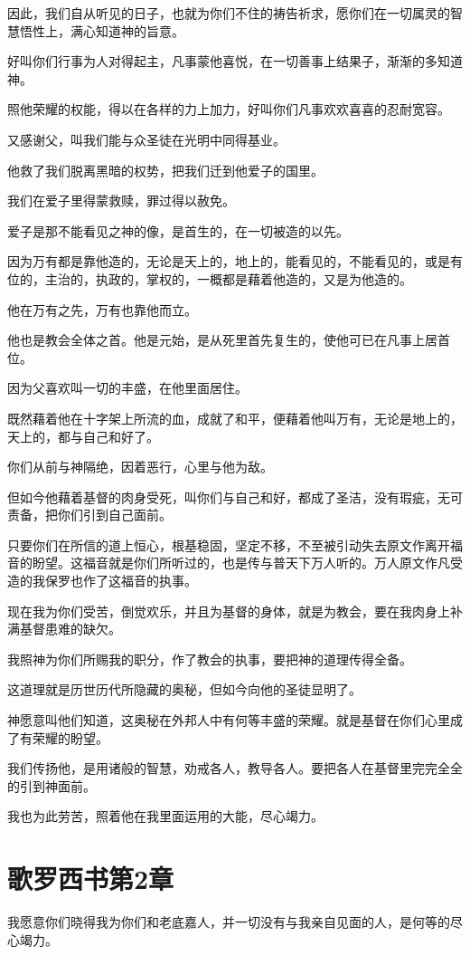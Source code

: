\documentclass[12pt,oneside]{book}
\begin{document}
因此，我们自从听见的日子，也就为你们不住的祷告祈求，愿你们在一切属灵的智慧悟性上，满心知道神的旨意。

好叫你们行事为人对得起主，凡事蒙他喜悦，在一切善事上结果子，渐渐的多知道神。

照他荣耀的权能，得以在各样的力上加力，好叫你们凡事欢欢喜喜的忍耐宽容。

又感谢父，叫我们能与众圣徒在光明中同得基业。

他救了我们脱离黑暗的权势，把我们迁到他爱子的国里。

我们在爱子里得蒙救赎，罪过得以赦免。

爱子是那不能看见之神的像，是首生的，在一切被造的以先。

因为万有都是靠他造的，无论是天上的，地上的，能看见的，不能看见的，或是有位的，主治的，执政的，掌权的，一概都是藉着他造的，又是为他造的。

他在万有之先，万有也靠他而立。

他也是教会全体之首。他是元始，是从死里首先复生的，使他可已在凡事上居首位。

因为父喜欢叫一切的丰盛，在他里面居住。

既然藉着他在十字架上所流的血，成就了和平，便藉着他叫万有，无论是地上的，天上的，都与自己和好了。

你们从前与神隔绝，因着恶行，心里与他为敌。

但如今他藉着基督的肉身受死，叫你们与自己和好，都成了圣洁，没有瑕疵，无可责备，把你们引到自己面前。

只要你们在所信的道上恒心，根基稳固，坚定不移，不至被引动失去原文作离开福音的盼望。这福音就是你们所听过的，也是传与普天下万人听的。万人原文作凡受造的我保罗也作了这福音的执事。

现在我为你们受苦，倒觉欢乐，并且为基督的身体，就是为教会，要在我肉身上补满基督患难的缺欠。

我照神为你们所赐我的职分，作了教会的执事，要把神的道理传得全备。

这道理就是历世历代所隐藏的奥秘，但如今向他的圣徒显明了。

神愿意叫他们知道，这奥秘在外邦人中有何等丰盛的荣耀。就是基督在你们心里成了有荣耀的盼望。

我们传扬他，是用诸般的智慧，劝戒各人，教导各人。要把各人在基督里完完全全的引到神面前。

我也为此劳苦，照着他在我里面运用的大能，尽心竭力。

\chapter{歌罗西书第2章}
我愿意你们晓得我为你们和老底嘉人，并一切没有与我亲自见面的人，是何等的尽心竭力。
\end{document}
